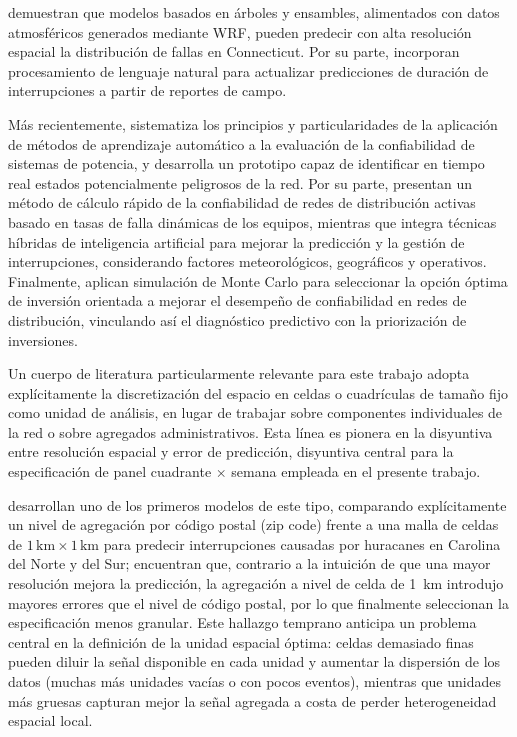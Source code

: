 \textcite{ref32} demuestran que modelos basados en árboles y ensambles, alimentados con datos atmosféricos generados mediante WRF, pueden predecir con alta resolución espacial la distribución de fallas en Connecticut. Por su parte, \textcite{ref33} incorporan procesamiento de lenguaje natural para actualizar predicciones de duración de interrupciones a partir de reportes de campo.

Más recientemente, \textcite{ref34} sistematiza los principios y particularidades de la aplicación de métodos de aprendizaje automático a la evaluación de la confiabilidad de sistemas de potencia, y desarrolla un prototipo capaz de identificar en tiempo real estados potencialmente peligrosos de la red. Por su parte, \textcite{ref35} presentan un método de cálculo rápido de la confiabilidad de redes de distribución activas basado en tasas de falla dinámicas de los equipos, mientras que \textcite{ref36} integra técnicas híbridas de inteligencia artificial para mejorar la predicción y la gestión de interrupciones, considerando factores meteorológicos, geográficos y operativos. Finalmente, \textcite{ref10} aplican simulación de Monte Carlo para seleccionar la opción óptima de inversión orientada a mejorar el desempeño de confiabilidad en redes de distribución, vinculando así el diagnóstico predictivo con la priorización de inversiones.

Un cuerpo de literatura particularmente relevante para este trabajo adopta explícitamente la discretización del espacio en celdas o cuadrículas de tamaño fijo como unidad de análisis, en lugar de trabajar sobre componentes individuales de la red o sobre agregados administrativos. Esta línea es pionera en la disyuntiva entre resolución espacial y error de predicción, disyuntiva central para la especificación de panel cuadrante $\times$ semana empleada en el presente trabajo.

\textcite{ref68liu} desarrollan uno de los primeros modelos de este tipo, comparando explícitamente un nivel de agregación por código postal (zip code) frente a una malla de celdas de $1\,\text{km}\times 1\,\text{km}$ para predecir interrupciones causadas por huracanes en Carolina del Norte y del Sur; encuentran que, contrario a la intuición de que una mayor resolución mejora la predicción, la agregación a nivel de celda de 1~km introdujo mayores errores que el nivel de código postal, por lo que finalmente seleccionan la especificación menos granular. Este hallazgo temprano anticipa un problema central en la definición de la unidad espacial óptima: celdas demasiado finas pueden diluir la señal disponible en cada unidad y aumentar la dispersión de los datos (muchas más unidades vacías o con pocos eventos), mientras que unidades más gruesas capturan mejor la señal agregada a costa de perder heterogeneidad espacial local.

